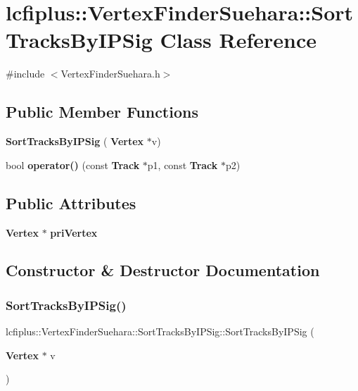 \section{lcfiplus\+:\+:Vertex\+Finder\+Suehara\+:\+:Sort\+Tracks\+By\+I\+P\+Sig Class Reference}
\label{classlcfiplus_1_1VertexFinderSuehara_1_1SortTracksByIPSig}


{\ttfamily \#include $<$Vertex\+Finder\+Suehara.\+h$>$}

\subsection*{Public Member Functions}
\begin{DoxyCompactItemize}
\item 
\textbf{ Sort\+Tracks\+By\+I\+P\+Sig} (\textbf{ Vertex} $\ast$v)
\item 
bool \textbf{ operator()} (const \textbf{ Track} $\ast$p1, const \textbf{ Track} $\ast$p2)
\end{DoxyCompactItemize}
\subsection*{Public Attributes}
\begin{DoxyCompactItemize}
\item 
\textbf{ Vertex} $\ast$ \textbf{ pri\+Vertex}
\end{DoxyCompactItemize}


\subsection{Constructor \& Destructor Documentation}
\mbox{\label{classlcfiplus_1_1VertexFinderSuehara_1_1SortTracksByIPSig_a5e3a690cc57cb5110113b694757a0ee5}} 
\subsubsection{Sort\+Tracks\+By\+I\+P\+Sig()}
{\footnotesize\ttfamily lcfiplus\+::\+Vertex\+Finder\+Suehara\+::\+Sort\+Tracks\+By\+I\+P\+Sig\+::\+Sort\+Tracks\+By\+I\+P\+Sig (\begin{DoxyParamCaption}\item[{\textbf{ Vertex} $\ast$}]{v }\end{DoxyParamCaption})\hspace{0.3cm}{\ttfamily [inline]}}



